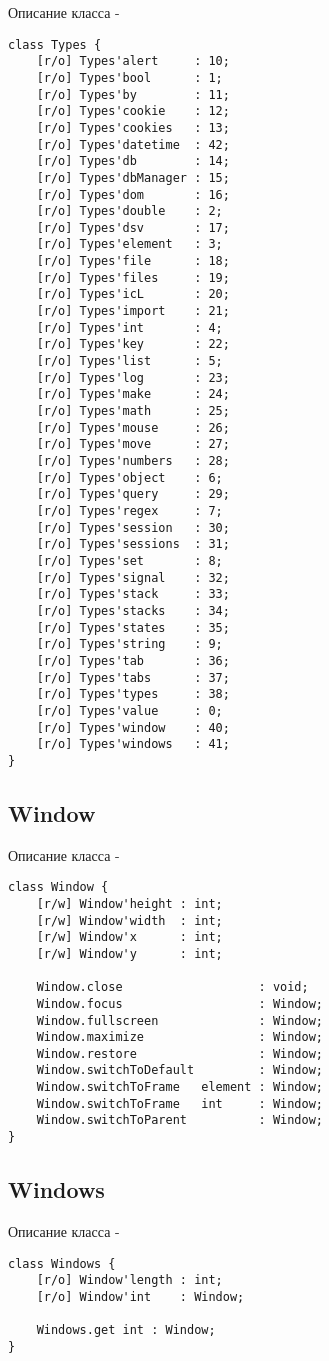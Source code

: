 \noindent Описание класса  -
\begin{lstlisting}[numbers=none]
class Types {
    [r/o] Types'alert     : 10;
	[r/o] Types'bool      : 1;
	[r/o] Types'by        : 11;
	[r/o] Types'cookie    : 12;
	[r/o] Types'cookies   : 13;
	[r/o] Types'datetime  : 42;
	[r/o] Types'db        : 14;
	[r/o] Types'dbManager : 15;
	[r/o] Types'dom       : 16;
	[r/o] Types'double    : 2;
	[r/o] Types'dsv       : 17;
	[r/o] Types'element   : 3;
	[r/o] Types'file      : 18;
	[r/o] Types'files     : 19;
	[r/o] Types'icL       : 20;
	[r/o] Types'import    : 21;
	[r/o] Types'int       : 4;
	[r/o] Types'key       : 22;
	[r/o] Types'list      : 5;
	[r/o] Types'log       : 23;
	[r/o] Types'make      : 24;
	[r/o] Types'math      : 25;
	[r/o] Types'mouse     : 26;
	[r/o] Types'move      : 27;
	[r/o] Types'numbers   : 28;
	[r/o] Types'object    : 6;
	[r/o] Types'query     : 29;
	[r/o] Types'regex     : 7;
	[r/o] Types'session   : 30;
	[r/o] Types'sessions  : 31;
	[r/o] Types'set       : 8;
	[r/o] Types'signal    : 32;
	[r/o] Types'stack     : 33;
	[r/o] Types'stacks    : 34;
	[r/o] Types'states    : 35;
	[r/o] Types'string    : 9;
	[r/o] Types'tab       : 36;
	[r/o] Types'tabs      : 37;
	[r/o] Types'types     : 38;
	[r/o] Types'value     : 0;
	[r/o] Types'window    : 40;
	[r/o] Types'windows   : 41;
}
\end{lstlisting}

\subsection{{\color{orange} Window}}

\noindent Описание класса  -
\begin{lstlisting}[numbers=none]
class Window {
    [r/w] Window'height : int;
	[r/w] Window'width  : int;
	[r/w] Window'x      : int;
	[r/w] Window'y      : int;
	
    Window.close                   : void;
	Window.focus                   : Window;
	Window.fullscreen              : Window;
	Window.maximize                : Window;
	Window.restore                 : Window;
	Window.switchToDefault         : Window;
	Window.switchToFrame   element : Window;
	Window.switchToFrame   int     : Window;
	Window.switchToParent          : Window;
}
\end{lstlisting}

\subsection{{\color{orange} Windows}}

\noindent Описание класса  -
\begin{lstlisting}[numbers=none]
class Windows {
    [r/o] Window'length : int;
	[r/o] Window'int    : Window;
	
    Windows.get int : Window;
}
\end{lstlisting}


